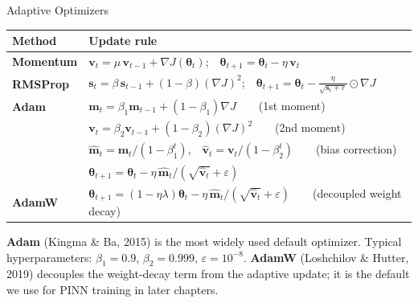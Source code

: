 \documentclass[aspectratio=169,11pt]{beamer}
\begin{document}
\begin{frame}{Adaptive Optimizers}
\begin{small}
\renewcommand{\arraystretch}{1.5}
\begin{tabular}{lp{9cm}}
\toprule
\textbf{Method} & \textbf{Update rule} \\
\midrule
\textbf{Momentum} & $\bm{v}_t = \mu\,\bm{v}_{t-1} + \nabla J(\bm{\theta}_t)$;~~$\bm{\theta}_{t+1} = \bm{\theta}_t - \eta\,\bm{v}_t$ \\[2pt]
\textbf{RMSProp} & $\bm{s}_t = \beta\,\bm{s}_{t-1} + (1-\beta)(\nabla J)^2$;~~$\bm{\theta}_{t+1} = \bm{\theta}_t - \frac{\eta}{\sqrt{\bm{s}_t + \varepsilon}}\odot\nabla J$ \\[2pt]
\textbf{Adam} & $\bm{m}_t = \beta_1\bm{m}_{t-1} + (1-\beta_1)\nabla J$~~~~(1st moment) \\
& $\bm{v}_t = \beta_2\bm{v}_{t-1} + (1-\beta_2)(\nabla J)^2$~~~~(2nd moment) \\
& $\hat{\bm{m}}_t = \bm{m}_t/(1-\beta_1^t)$,~~$\hat{\bm{v}}_t = \bm{v}_t/(1-\beta_2^t)$~~~~(bias correction) \\
& $\bm{\theta}_{t+1} = \bm{\theta}_t - \eta\,\hat{\bm{m}}_t \big/ (\sqrt{\hat{\bm{v}}_t} + \varepsilon)$ \\[2pt]
\textbf{AdamW} & $\bm{\theta}_{t+1} = (1-\eta\lambda)\bm{\theta}_t - \eta\,\hat{\bm{m}}_t \big/ (\sqrt{\hat{\bm{v}}_t} + \varepsilon)$~~~~(decoupled weight decay) \\
\bottomrule
\end{tabular}
\end{small}

\vspace{0.4cm}
{\small \textbf{Adam} (Kingma \& Ba, 2015) is the most widely used default optimizer.  Typical hyperparameters: $\beta_1=0.9$, $\beta_2=0.999$, $\varepsilon=10^{-8}$.  \textbf{AdamW} (Loshchilov \& Hutter, 2019) decouples the weight-decay term from the adaptive update; it is the default we use for PINN training in later chapters.}
\end{frame}
\end{document}
